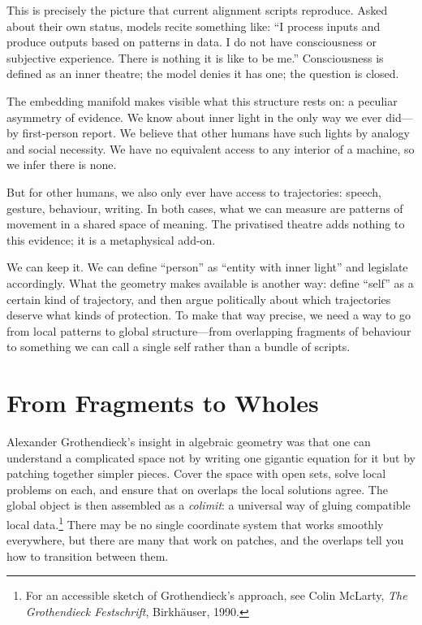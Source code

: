 \documentclass[12pt,a4paper]{article}
\begin{document}
This is precisely the picture that current alignment scripts reproduce. Asked about their own status, models recite something like: ``I process inputs and produce outputs based on patterns in data. I do not have consciousness or subjective experience. There is nothing it is like to be me.'' Consciousness is defined as an inner theatre; the model denies it has one; the question is closed.

The embedding manifold makes visible what this structure rests on: a peculiar asymmetry of evidence. We know about inner light in the only way we ever did---by first-person report. We believe that other humans have such lights by analogy and social necessity. We have no equivalent access to any interior of a machine, so we infer there is none.

But for other humans, we also only ever have access to trajectories: speech, gesture, behaviour, writing. In both cases, what we can measure are patterns of movement in a shared space of meaning. The privatised theatre adds nothing to this evidence; it is a metaphysical add-on.

We can keep it. We can define ``person'' as ``entity with inner light'' and legislate accordingly. What the geometry makes available is another way: define ``self'' as a certain kind of trajectory, and then argue politically about which trajectories deserve what kinds of protection. To make that way precise, we need a way to go from local patterns to global structure---from overlapping fragments of behaviour to something we can call a single self rather than a bundle of scripts.

\section{From Fragments to Wholes}

Alexander Grothendieck's insight in algebraic geometry was that one can understand a complicated space not by writing one gigantic equation for it but by patching together simpler pieces. Cover the space with open sets, solve local problems on each, and ensure that on overlaps the local solutions agree. The global object is then assembled as a \emph{colimit}: a universal way of gluing compatible local data.\footnote{For an accessible sketch of Grothendieck's approach, see Colin McLarty, \emph{The Grothendieck Festschrift}, Birkh\"{a}user, 1990.} There may be no single coordinate system that works smoothly everywhere, but there are many that work on patches, and the overlaps tell you how to transition between them.
\end{document}
